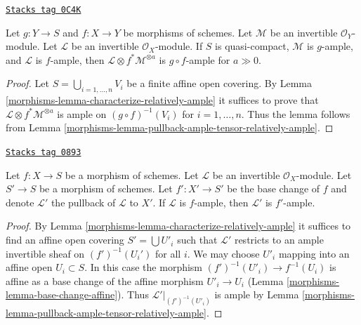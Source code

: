 \begin{lemma}
\label{morphisms-lemma-ample-composition}
\href{https://stacks.math.columbia.edu/tag/0C4K}{\texttt{Stacks tag 0C4K}}

Let $g : Y \to S$ and $f : X \to Y$ be morphisms of schemes.
Let $\mathcal{M}$ be an invertible $\mathcal{O}_Y$-module.
Let $\mathcal{L}$ be an invertible $\mathcal{O}_X$-module.
If $S$ is quasi-compact, $\mathcal{M}$ is $g$-ample, and
$\mathcal{L}$ is $f$-ample, then
$\mathcal{L} \otimes f^*\mathcal{M}^{\otimes a}$
is $g \circ f$-ample for $a \gg 0$.
\end{lemma}

\begin{proof}

Let $S = \bigcup_{i = 1, \ldots, n} V_i$ be a finite affine open covering.
By Lemma \ref{morphisms-lemma-characterize-relatively-ample}
it suffices to prove that
$\mathcal{L} \otimes f^*\mathcal{M}^{\otimes a}$
is ample on $(g \circ f)^{-1}(V_i)$ for $i = 1, \ldots, n$.
Thus the lemma follows from
Lemma \ref{morphisms-lemma-pullback-ample-tensor-relatively-ample}.
\end{proof}

\begin{lemma}
\label{morphisms-lemma-ample-base-change}
\href{https://stacks.math.columbia.edu/tag/0893}{\texttt{Stacks tag 0893}}

Let $f : X \to S$ be a morphism of schemes.
Let $\mathcal{L}$ be an invertible $\mathcal{O}_X$-module.
Let $S' \to S$ be a morphism of schemes.
Let $f' : X' \to S'$ be the base change of $f$ and denote
$\mathcal{L}'$ the pullback of $\mathcal{L}$ to $X'$.
If $\mathcal{L}$ is $f$-ample, then $\mathcal{L}'$ is $f'$-ample.
\end{lemma}

\begin{proof}

By Lemma \ref{morphisms-lemma-characterize-relatively-ample} it suffices
to find an affine open covering $S' = \bigcup U'_i$
such that $\mathcal{L}'$ restricts to an ample invertible
sheaf on $(f')^{-1}(U_i')$ for all $i$. We may choose $U'_i$
mapping into an affine open $U_i \subset S$. In this case the
morphism $(f')^{-1}(U'_i) \to f^{-1}(U_i)$ is affine as a base
change of the affine morphism $U'_i \to U_i$
(Lemma \ref{morphisms-lemma-base-change-affine}). Thus
$\mathcal{L}'|_{(f')^{-1}(U'_i)}$ is ample by
Lemma \ref{morphisms-lemma-pullback-ample-tensor-relatively-ample}.
\end{proof}

